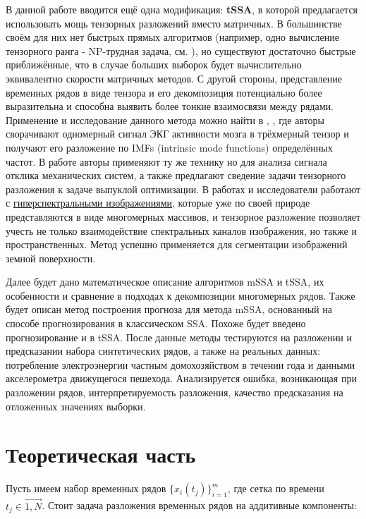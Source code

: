 	    В данной работе вводится ещё одна модификация: \textbf{tSSA}, в которой предлагается использовать мощь тензорных разложений вместо матричных. В большинстве своём для них нет быстрых прямых алгоритмов (например, одно вычисление тензорного ранга - NP-трудная задача, см. \cite{HASTAD1990644}), но существуют достаточно быстрые приближённые, что в случае больших выборок будет вычислительно эквивалентно скорости матричных методов. С другой стороны, представление временных рядов в виде тензора и его декомпозиция потенциально более выразительна и способна  выявить более тонкие взаимосвязи между рядами. Применение и исследование данного метода можно найти в \cite{6661921}, \cite{6834801}, где авторы сворачивают одномерный сигнал ЭКГ активности мозга в трёхмерный тензор и получают его разложение по IMFs (intrinsic mode functions) определённых частот. В работе \cite{app7040418} авторы применяют ту же технику но для анализа сигнала отклика механических систем, а также предлагают сведение задачи тензорного разложения к задаче выпуклой оптимизации. В работах \cite{10122507} и \cite{FU2023115} исследователи работают с \href{https://en.wikipedia.org/wiki/Hyperspectral_imaging}{гиперспектральными изображениями}, которые уже по своей природе представляются в виде многомерных массивов, и тензорное разложение позволяет учесть не только взаимодействие спектральных каналов изображения, но также и пространственных. Метод успешно применяется для сегментации изображений земной поверхности. 
	    
	    Далее будет дано математическое описание алгоритмов mSSA и tSSA, их особенности и сравнение в подходах к декомпозиции многомерных рядов. Также будет описан метод построения прогноза для метода mSSA, основанный на способе прогнозирования в классическом SSA. Похоже будет введено прогнозирование и в tSSA. После данные методы тестируются на разложении и предсказании набора синтетических рядов, а также на реальных данных: потребление электроэнергии частным домохозяйством в течении года и данными акселерометра движущегося пешехода. Анализируется ошибка, возникающая при разложении рядов, интерпретируемость разложения, качество предсказания на отложенных значениях выборки. 
	    
	    \section*{Теоретическая часть}
	    
	    	Пусть имеем набор временных рядов $ \{x_i(t_j)\}_{i = 1}^{m} $, где сетка по времени $ t_j \in \overrightarrow{1, N} $. Стоит задача разложения временных рядов на аддитивные компоненты: 
	    	
